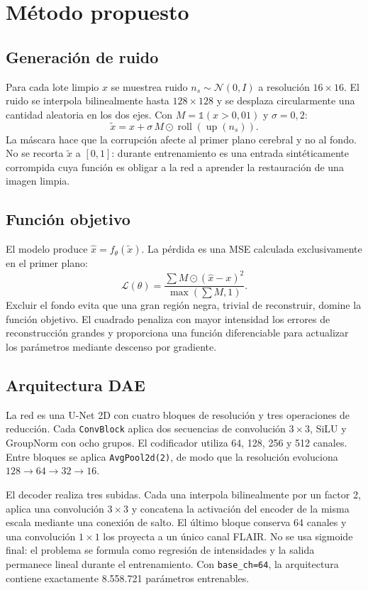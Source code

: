 \documentclass[10pt,a4paper,twocolumn]{article}
\begin{document}
\section{Método propuesto}

\subsection{Generación de ruido}
Para cada lote limpio $x$ se muestrea ruido
$n_s\sim\mathcal N(0,I)$ a resolución $16\times16$. El ruido se interpola
bilinealmente hasta $128\times128$ y se desplaza circularmente una cantidad
aleatoria en los dos ejes. Con $M=\mathbb{1}(x>0{,}01)$ y $\sigma=0{,}2$:
\[
 \widetilde{x}=x+\sigma\,M\odot
 \operatorname{roll}(\operatorname{up}(n_s)).
\]
La máscara hace que la corrupción afecte al primer plano cerebral y no al fondo.
No se recorta $\widetilde{x}$ a $[0,1]$: durante entrenamiento es una entrada
sintéticamente corrompida cuya función es obligar a la red a aprender la
restauración de una imagen limpia.

\subsection{Función objetivo}
El modelo produce $\hat{x}=f_\theta(\widetilde{x})$. La pérdida es una MSE
calculada exclusivamente en el primer plano:
\[
 \mathcal L(\theta)=
 \frac{\sum M\odot(\hat{x}-x)^2}{\max(\sum M,1)}.
\]
Excluir el fondo evita que una gran región negra, trivial de reconstruir, domine
la función objetivo. El cuadrado penaliza con mayor intensidad los errores de
reconstrucción grandes y proporciona una función diferenciable para actualizar
los parámetros mediante descenso por gradiente.

\subsection{Arquitectura DAE}
La red es una U-Net 2D con cuatro bloques de resolución y tres operaciones de
reducción. Cada \texttt{ConvBlock} aplica dos secuencias de convolución
$3\times3$, SiLU y GroupNorm con ocho grupos. El codificador utiliza 64, 128,
256 y 512 canales. Entre bloques se aplica \texttt{AvgPool2d(2)}, de modo que la
resolución evoluciona $128\rightarrow64\rightarrow32\rightarrow16$.

El decoder realiza tres subidas. Cada una interpola bilinealmente por un factor
2, aplica una convolución $3\times3$ y concatena la activación del encoder de la
misma escala mediante una conexión de salto. El último bloque conserva 64
canales y una convolución $1\times1$ los proyecta a un único canal FLAIR. No se
usa sigmoide final: el problema se formula como regresión de intensidades y la
salida permanece lineal durante el entrenamiento. Con \texttt{base\_ch=64}, la
arquitectura contiene exactamente 8.558.721 parámetros entrenables.
\end{document}
